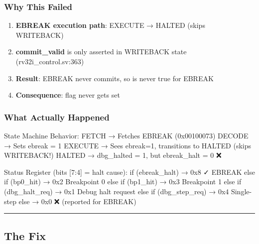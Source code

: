 \subsubsection{Why This Failed}\label{cr:fix:ebreak-bug-fix:why-this-failed}

\begin{record}

\begin{enumerate}
\def\labelenumi{\arabic{enumi}.}
\tightlist
\item
  \textbf{EBREAK execution path}: EXECUTE → HALTED (skips WRITEBACK)
\item
  \textbf{commit\_\allowbreak{}valid} is only asserted in WRITEBACK
  state (rv32i\_\allowbreak{}control.sv:363)
\item
  \textbf{Result}: EBREAK never commits, so  is never
  true for EBREAK
\item
  \textbf{Consequence}:  flag never gets set
\end{enumerate}

\end{record}

\subsubsection{What Actually Happened}\label{cr:fix:ebreak-bug-fix:what-actually-happened}

\begin{record}

\begin{textblock}
State Machine Behavior:
  FETCH    → Fetches EBREAK (0x00100073)
  DECODE   → Sets ebreak = 1
  EXECUTE  → Sees ebreak=1, transitions to HALTED (skips WRITEBACK!)
  HALTED   → dbg_halted = 1, but ebreak_halt = 0 ❌

Status Register (bits [7:4] = halt cause):
  if (ebreak_halt)        → 0x8 ✓ EBREAK
  else if (bp0_hit)       → 0x2   Breakpoint 0
  else if (bp1_hit)       → 0x3   Breakpoint 1
  else if (dbg_halt_req)  → 0x1   Debug halt request
  else if (dbg_step_req)  → 0x4   Single-step
  else                    → 0x0 ❌ (reported for EBREAK)
\end{textblock}

\begin{center}\rule{0.5\linewidth}{0.5pt}\end{center}

\end{record}

\subsection{The Fix}\label{cr:fix:ebreak-bug-fix:the-fix}

